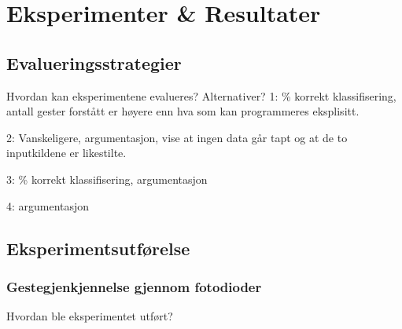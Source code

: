 \section[Eksperimenter \& Resultater]{Eksperimenter \& Resultater}
\subsection{Evalueringsstrategier}
{\color{red}Hvordan kan eksperimentene evalueres? Alternativer?}
1: \% korrekt klassifisering, antall gester forstått er høyere enn hva som kan programmeres eksplisitt.

2: Vanskeligere, argumentasjon, vise at ingen data går tapt og at de to inputkildene er likestilte.

3: \% korrekt klassifisering, argumentasjon

4: argumentasjon

\subsection{Eksperimentsutførelse}

\subsubsection*{Gestegjenkjennelse gjennom fotodioder}
{\color{red}Hvordan ble eksperimentet utført?}


